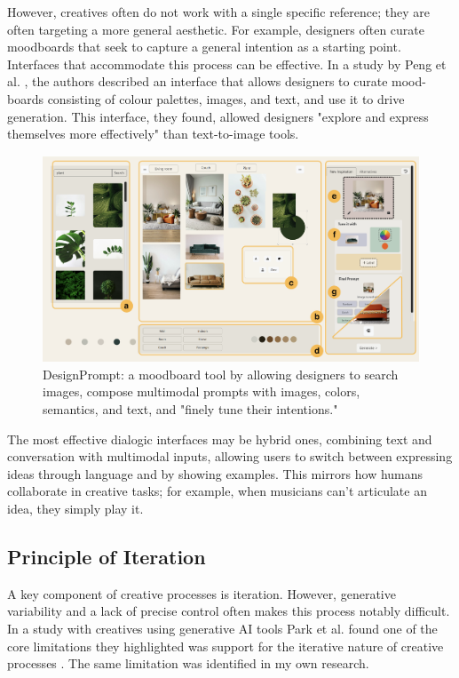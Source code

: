 However, creatives often do not work with a single specific reference; they are often targeting a more general aesthetic. For example, designers often curate moodboards that seek to capture a general intention as a starting point. Interfaces that accommodate this process can be effective. In a study by Peng et al. \cite{Peng2024-tr}, the authors described an interface that allows designers to curate mood-boards consisting of colour palettes, images, and text, and use it to drive generation. This interface, they found, allowed designers "explore and express themselves more effectively" than text-to-image tools.

\begin{figure}
    \centering
    \includegraphics[width=1\linewidth]{designprompt.png}
    \caption{DesignPrompt: a moodboard tool by \cite{Peng2024-tr} allowing designers to search images, compose multimodal prompts with images, colors, semantics, and text, and "finely tune their intentions."}
    \label{fig:enter-label}
\end{figure}

The most effective dialogic interfaces may be hybrid ones, combining text and conversation with multimodal inputs, allowing users to switch between expressing ideas through language and by showing examples. This mirrors how humans collaborate in creative tasks; for example, when musicians can't articulate an idea, they simply play it.

\subsection{Principle of Iteration}

A key component of creative processes is iteration. However, generative variability and a lack of precise control often makes this process notably difficult. In a study with creatives using generative AI tools Park et al. found one of the core limitations they highlighted was support for the iterative nature of creative processes \cite{Park2024-gw}. The same limitation was identified in my own research. 

